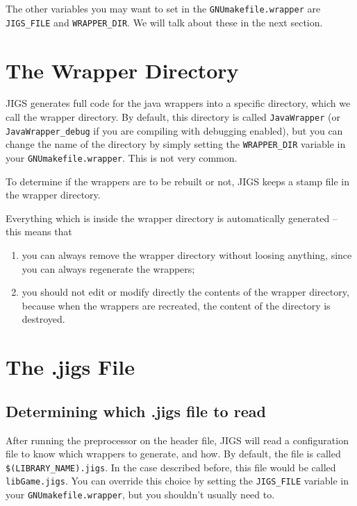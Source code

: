 The other variables you may want to set in the
\texttt{GNUmakefile.wrapper} are \texttt{JIGS\_FILE} and
\texttt{WRAPPER\_DIR}.  We will talk about these in the next section.

\section{The Wrapper Directory}
JIGS generates full code for the java wrappers into a specific
directory, which we call the wrapper directory.  By default, this
directory is called \texttt{JavaWrapper} (or
\texttt{JavaWrapper\_debug} if you are compiling with debugging
enabled), but you can change the name of the directory by simply
setting the \texttt{WRAPPER\_DIR} variable in your
\texttt{GNUmakefile.wrapper}.  This is not very common.

To determine if the wrappers are to be rebuilt or not, JIGS keeps a
stamp file in the wrapper directory.

Everything which is inside the wrapper directory is automatically
generated -- this means that
\begin{enumerate}
\item you can always remove the wrapper directory without loosing anything, 
since you can always regenerate the wrappers;
\item you should not edit or modify directly the contents of the wrapper 
directory, because when the wrappers are recreated, the content of the 
directory is destroyed.
\end{enumerate}

\section{The .jigs File}

\subsection{Determining which .jigs file to read}
After running the preprocessor on the header file, JIGS will read a
configuration file to know which wrappers to generate, and how.  By
default, the file is called \texttt{\$(LIBRARY\_NAME).jigs}.  In the
case described before, this file would be called
\texttt{libGame.jigs}.  You can override this choice by setting the
\texttt{JIGS\_FILE} variable in your \texttt{GNUmakefile.wrapper}, 
but you shouldn't usually need to.

